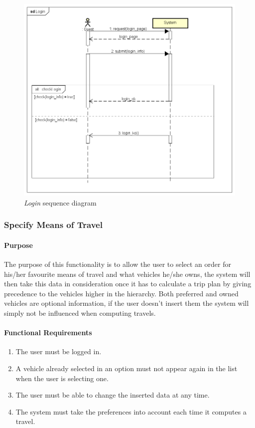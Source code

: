 \begin{figure}
	\includegraphics[width=\textwidth, height=\textheight, keepaspectratio=true]{Img/LoginSQ}
	\caption{\emph{Login} sequence diagram}
	\label{fig:loginsq}
\end{figure}

\clearpage
\subsubsection{Specify Means of Travel}
\paragraph*{Purpose\\}
The purpose of this functionality is to allow the user to select an order for his/her favourite means of travel and what vehicles he/she owns, the system will then take this data in consideration once it has to calculate a trip plan by giving precedence to the vehicles higher in the hierarchy.
Both preferred and owned vehicles are optional information, if the user doesn't insert them the system will simply not be influenced when computing travels.

\paragraph*{Functional Requirements}
\begin{enumerate}[label=R.\arabic*:,resume]
	\item The user must be logged in.
	\item A vehicle already selected in an option must not appear again in the list when the user is selecting one.
	\item The user must be able to change the inserted data at any time.
	\item The system must take the preferences into account each time it computes a travel.
\end{enumerate}

